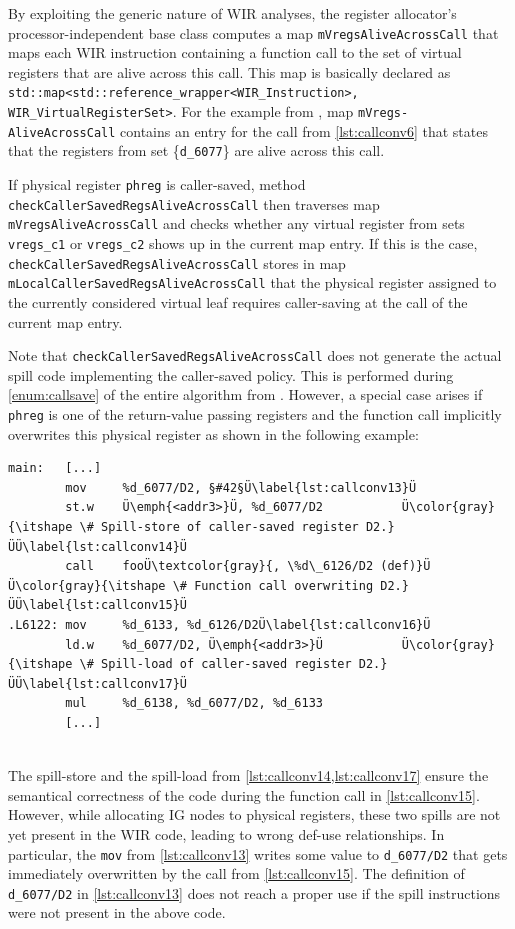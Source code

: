 By exploiting the generic nature of \gls{WIR} analyses, the register allocator's processor-independent base class computes a map \texttt{mVregsAliveAcrossCall} that maps each \gls{WIR} instruction containing a function call to the set of virtual registers that are alive across this call.
This map is basically declared as \texttt{std::map<std::reference\-\_wrapper<WIR\_Instruction>, WIR\_VirtualRegisterSet>}.
For the example from , map \texttt{mVregs- AliveAcrossCall} contains an entry for the call from \cref{lst:callconv6} that states that the registers from set \{\texttt{d\_6077}\} are alive across this call.

If physical register \texttt{phreg} is caller-saved, method \texttt{checkCallerSavedRegsAliveAcrossCall} then traverses map \texttt{mVregsAliveAcrossCall} and checks whether any virtual register from sets \texttt{vregs\_c1} or \texttt{vregs\_c2} shows up in the current map entry.
If this is the case, \texttt{checkCallerSavedRegsAliveAcrossCall} stores in map \texttt{mLocalCallerSavedRegsAliveAcrossCall} that the physical register assigned to the currently considered virtual leaf requires caller-saving at the call of the current map entry.

Note that \texttt{checkCallerSavedRegsAliveAcrossCall} does not generate the actual spill code implementing the caller-saved policy.
This is performed during \cref{enum:callsave} of the entire algorithm from .
However, a special case arises if \texttt{phreg} is one of the return-value passing registers and the function call implicitly overwrites this physical register as shown in the following example: \\
\begin{lstlisting}[style=code,float=!h,aboveskip=-0.8 \baselineskip,belowskip=-0.8 \baselineskip]
main:   [...]
        mov     %d_6077/D2, §#42§Ü\label{lst:callconv13}Ü
        st.w    Ü\emph{<addr3>}Ü, %d_6077/D2           Ü\color{gray}{\itshape \# Spill-store of caller-saved register D2.}ÜÜ\label{lst:callconv14}Ü
        call    fooÜ\textcolor{gray}{, \%d\_6126/D2 (def)}Ü         Ü\color{gray}{\itshape \# Function call overwriting D2.}ÜÜ\label{lst:callconv15}Ü
.L6122: mov     %d_6133, %d_6126/D2Ü\label{lst:callconv16}Ü
        ld.w    %d_6077/D2, Ü\emph{<addr3>}Ü           Ü\color{gray}{\itshape \# Spill-load of caller-saved register D2.}ÜÜ\label{lst:callconv17}Ü
        mul     %d_6138, %d_6077/D2, %d_6133
        [...]
\end{lstlisting}
\\
The spill-store and the spill-load from \cref{lst:callconv14,lst:callconv17} ensure the semantical correctness of the code during the function call in \cref{lst:callconv15}.
However, while allocating \gls{IG} nodes to physical registers, these two spills are not yet present in the \gls{WIR} code, leading to wrong def-use relationships.
In particular, the \texttt{mov} from \cref{lst:callconv13} writes some value to \texttt{d\_6077/D2} that gets immediately overwritten by the call from \cref{lst:callconv15}.
The definition of \texttt{d\_6077/D2} in \cref{lst:callconv13} does not reach a proper use if the spill instructions were not present in the above code.

